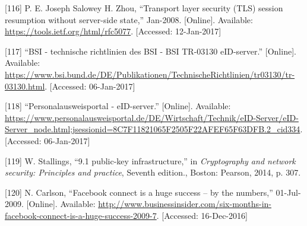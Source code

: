 \documentclass[12pt,english,a4paper,titlepage,cleardoublepage=empty,dottedtoc]{report}
\begin{document}
\hypertarget{ref-web_spec_tls-session-ticket-resumption}{}
{[}116{]} P. E. Joseph Salowey H. Zhou, ``Transport layer security (TLS)
session resumption without server-side state,'' Jan-2008. {[}Online{]}.
Available: \url{https://tools.ietf.org/html/rfc5077}. {[}Accessed:
12-Jan-2017{]}

\hypertarget{ref-web_bsi-spec_eid}{}
{[}117{]} ``BSI - technische richtlinien des BSI - BSI TR-03130
eID-server.'' {[}Online{]}. Available:
\url{https://www.bsi.bund.de/DE/Publikationen/TechnischeRichtlinien/tr03130/tr-03130.html}.
{[}Accessed: 06-Jan-2017{]}

\hypertarget{ref-web_2017_npa-eid-server}{}
{[}118{]} ``Personalausweisportal - eID-server.'' {[}Online{]}.
Available:
\url{https://www.personalausweisportal.de/DE/Wirtschaft/Technik/eID-Server/eID-Server_node.html;jsessionid=8C7F11821065F2505F22AFEF65F63DFB.2_cid334}.
{[}Accessed: 06-Jan-2017{]}

\hypertarget{ref-book_2014_chapter-10-5-asym-random-number-gen}{}
{[}119{]} W. Stallings, ``9.1 public-key infrastructure,'' in
\emph{Cryptography and network security: Principles and practice},
Seventh edition., Boston: Pearson, 2014, p. 307.

\hypertarget{ref-web_2009-success-of-facebook-connect}{}
{[}120{]} N. Carlson, ``Facebook connect is a huge success -- by the
numbers,'' 01-Jul-2009. {[}Online{]}. Available:
\url{http://www.businessinsider.com/six-months-in-facebook-connect-is-a-huge-success-2009-7}.
{[}Accessed: 16-Dec-2016{]}
\end{document}
